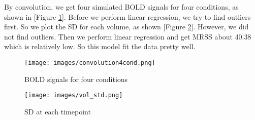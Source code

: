 \par \indent By convolution, we get four simulated BOLD signals for four
conditions, as shown in [Figure \ref{fig:convolution}]. Before we perform linear regression, we try to find outliers first. So we plot the SD for each volume, as shown [Figure \ref{fig:VolumeSD}]. However, we did not find outliers. Then we perform linear regression and get MRSS about 40.38 which is relatively low. So this model fit the data pretty well. 

\begin{figure}[h!]
\centering
\texttt{[image: images/convolution4cond.png]}
\caption{BOLD signals for four conditions}
\label{fig:convolution}
\end{figure}

\begin{figure}[h!]
\centering
\texttt{[image: images/vol\_std.png]}               
\caption{SD at each timepoint}
\label{fig:VolumeSD}
\end{figure}
